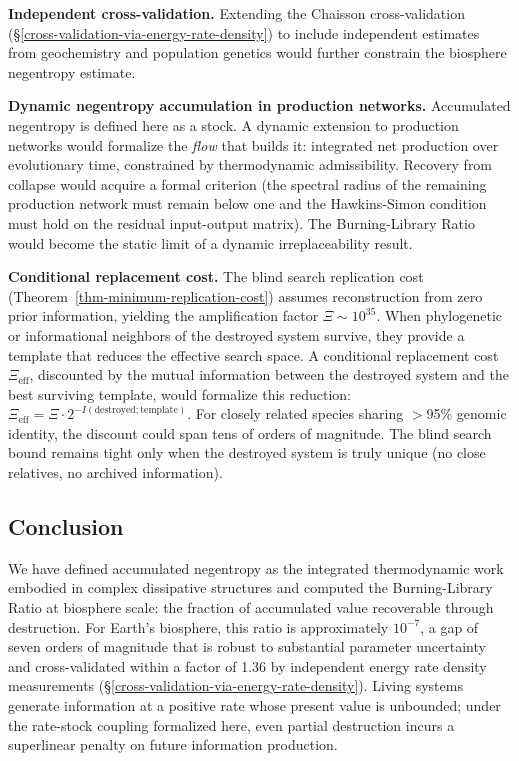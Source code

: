 \documentclass[11pt]{article}
\theoremstyle{plain}
\theoremstyle{definition}
\theoremstyle{remark}
\let\origsubsection\subsection
\renewcommand{\subsection}{\needspace{7\baselineskip}\origsubsection}
\begin{document}
\textbf{Independent cross-validation.} Extending the Chaisson
cross-validation (§\ref{cross-validation-via-energy-rate-density}) to
include independent estimates from geochemistry and population genetics
would further constrain the biosphere negentropy estimate.

\textbf{Dynamic negentropy accumulation in production networks.}
Accumulated negentropy is defined here as a stock. A dynamic extension
to production networks would formalize the \emph{flow} that builds it:
integrated net production over evolutionary time, constrained by
thermodynamic admissibility. Recovery from collapse would acquire a
formal criterion (the spectral radius of the remaining production
network must remain below one and the Hawkins-Simon condition must hold
on the residual input-output matrix). The Burning-Library Ratio would
become the static limit of a dynamic irreplaceability result.

\textbf{Conditional replacement cost.} The blind search replication cost
(Theorem~\ref{thm-minimum-replication-cost}) assumes reconstruction from
zero prior information, yielding the amplification factor
\(\Xi \sim 10^{35}\). When phylogenetic or informational neighbors of
the destroyed system survive, they provide a template that reduces the
effective search space. A conditional replacement cost
\(\Xi_{\text{eff}}\), discounted by the mutual information between the
destroyed system and the best surviving template, would formalize this
reduction:
\(\Xi_{\text{eff}} = \Xi \cdot 2^{-I(\text{destroyed};\text{template})}\).
For closely related species sharing $>$95\% genomic identity, the
discount could span tens of orders of magnitude. The blind search bound
remains tight only when the destroyed system is truly unique (no close
relatives, no archived information).

\subsection{Conclusion}\label{conclusion-2}

We have defined accumulated negentropy as the integrated thermodynamic
work embodied in complex dissipative structures and computed the
Burning-Library Ratio at biosphere scale: the fraction of accumulated
value recoverable through destruction. For Earth's biosphere, this ratio
is approximately \(10^{-7}\), a gap of seven orders of magnitude that is
robust to substantial parameter uncertainty and cross-validated within a
factor of 1.36 by independent energy rate density measurements
(§\ref{cross-validation-via-energy-rate-density}). Living systems
generate information at a positive rate whose present value is
unbounded; under the rate-stock coupling formalized here, even partial
destruction incurs a superlinear penalty on future information
production.
\end{document}
